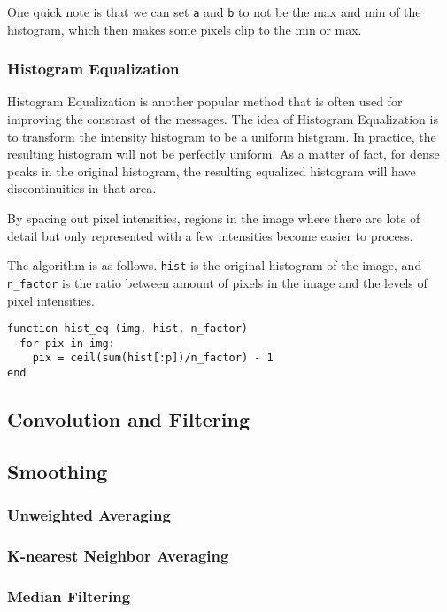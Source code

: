 \documentclass{article}
\begin{document}
\begin{multicols}{2}
One quick note is that we can set \texttt{a} and \texttt{b} to not be the max and min of the histogram, which then makes some pixels clip to the min or max.

\subsubsection{Histogram Equalization}

Histogram Equalization is another popular method that is often used for improving the constrast of the messages. The idea of Histogram Equalization is to transform the intensity histogram to be a uniform histgram. In practice, the resulting histogram will not be perfectly uniform. As a matter of fact, for dense peaks in the original histogram, the resulting equalized histogram will have discontinuities in that area.

By spacing out pixel intensities, regions in the image where there are lots of detail but only represented with a few intensities become easier to process.

The algorithm is as follows. \texttt{hist} is the original histogram of the image, and \texttt{n\_factor} is the ratio between amount of pixels in the image and the levels of pixel intensities.

\begin{verbatim}
function hist_eq (img, hist, n_factor)
  for pix in img:
    pix = ceil(sum(hist[:p])/n_factor) - 1
end
\end{verbatim}

\subsection{Convolution and Filtering}

\subsection{Smoothing}
\subsubsection{Unweighted Averaging}
\subsubsection{K-nearest Neighbor Averaging}
\subsubsection{Median Filtering}

\end{multicols}
\end{document}
